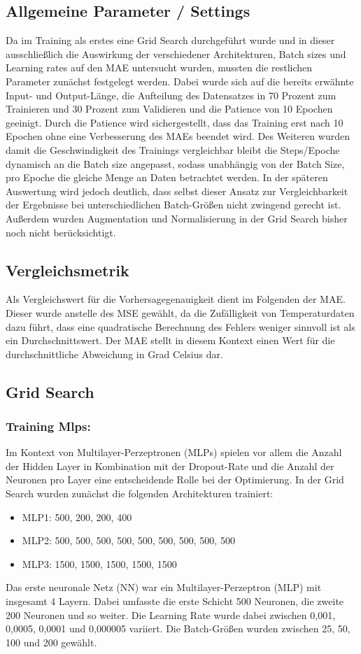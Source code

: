 \documentclass[acmtog, authorversion]{acmart} %
\begin{document}
\subsection{Allgemeine Parameter / Settings}

Da im Training als erstes eine Grid Search durchgeführt wurde und in dieser ausschließlich die Auswirkung der verschiedener Architekturen, Batch sizes und Learning rates auf den MAE untersucht wurden, mussten die restlichen Parameter zunächst festgelegt werden. Dabei wurde sich auf die bereits erwähnte Input- und Output-Länge, die Aufteilung des Datensatzes in 70 Prozent zum Trainieren und 30 Prozent zum Validieren und die Patience von 10 Epochen geeinigt. Durch die Patience wird sichergestellt, dass das Training erst nach 10 Epochen ohne eine Verbesserung des MAEs beendet wird. Des Weiteren wurden damit die Geschwindigkeit des Trainings vergleichbar bleibt die Steps/Epoche dynamisch an die Batch size angepasst, sodass unabhängig von der Batch Size, pro Epoche die gleiche Menge an Daten betrachtet werden. In der späteren Auswertung wird jedoch deutlich, dass selbst dieser Ansatz zur Vergleichbarkeit der Ergebnisse bei unterschiedlichen Batch-Größen nicht zwingend gerecht ist. Außerdem wurden Augmentation und Normalisierung in der Grid Search bisher noch nicht berücksichtigt.

\subsection{Vergleichsmetrik}
Als Vergleichswert für die Vorhersagegenauigkeit dient im Folgenden der MAE. Dieser wurde anstelle des MSE gewählt, da die Zufälligkeit von Temperaturdaten dazu führt, dass eine quadratische Berechnung des Fehlers weniger sinnvoll ist als ein Durchschnittswert. Der MAE stellt in diesem Kontext einen Wert für die durchschnittliche Abweichung in Grad Celsius dar.

\subsection{Grid Search}
\subsubsection{Training Mlps: }
Im Kontext von Multilayer-Perzeptronen (MLPs) spielen vor allem die Anzahl der Hidden Layer in Kombination mit der Dropout-Rate und die Anzahl der Neuronen pro Layer eine entscheidende Rolle bei der Optimierung. In der Grid Search wurden zunächst die folgenden Architekturen trainiert:
\begin{itemize}
    \item MLP1: 500, 200, 200, 400
    \item MLP2: 500, 500, 500, 500, 500, 500, 500, 500, 500
    \item MLP3: 1500, 1500, 1500, 1500, 1500
\end{itemize}
Das erste neuronale Netz (NN) war ein Multilayer-Perzeptron (MLP) mit insgesamt 4 Layern. Dabei umfasste die erste Schicht 500 Neuronen, die zweite 200 Neuronen und so weiter. Die Learning Rate wurde dabei zwischen 0,001, 0,0005, 0,0001 und 0,000005 variiert. Die Batch-Größen wurden zwischen 25, 50, 100 und 200 gewählt.
\end{document}
